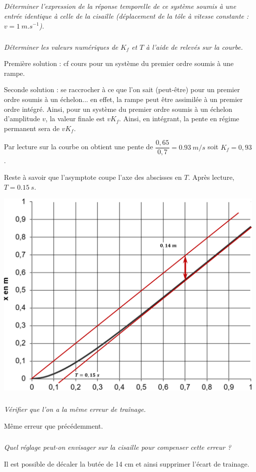 \documentclass[10pt,fleqn]{article} %
\begin{document}
\begin{multicols}{2}
\subparagraph{}\textit{Déterminer l'expression de la réponse temporelle de ce système soumis à une entrée identique à celle de la cisaille (déplacement de la tôle à vitesse constante : $v = \SI{1}{m.s^{-1}}$).}
\subparagraph{}\textit{Déterminer les valeurs numériques de $K_f$ et $T$ à l'aide de relevés sur la courbe.}
\ifprof \begin{corrige}

Première solution : cf cours pour un système du premier ordre soumis à une rampe. 

Seconde solution : se raccrocher à ce que l'on sait (peut-être) pour un premier ordre soumis à un échelon... en effet, la rampe peut être assimilée à un premier ordre intégré. Ainsi, pour un système du premier ordre soumis à un échelon d'amplitude $v$, la valeur finale est $vK_f$. Ainsi, en intégrant, la pente en régime permanent sera de $vK_f$. 

Par lecture sur la courbe on obtient une pente de $\dfrac{0,65}{0,7}=\SI{0,93}{m/s}$ soit $K_f=0,93$. 

Reste à savoir que l'asymptote coupe l'axe des abscisses en $T$. Après lecture, $T=\SI{0,15}{s}$.
\end{corrige} 
\begin{center}
\includegraphics[width=\linewidth]{images/cor_04}
\end{center}
\else \fi





\subparagraph{}\textit{Vérifier que l'on a la même erreur de traînage.}
\ifprof \begin{corrige}
Même erreur que précédemment.
\end{corrige} \else \fi

\subparagraph{}\textit{Quel réglage peut-on envisager sur la cisaille pour compenser cette erreur ?}

\ifprof \begin{corrige}
Il est possible de décaler la butée de 14 cm et ainsi supprimer l'écart de trainage.
\end{corrige} \else \fi


\end{multicols}
\end{document}
